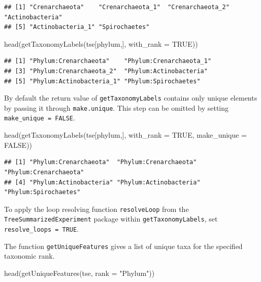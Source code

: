 \documentclass[
]{book}
\newenvironment{Shaded}{\begin{snugshade}}{\end{snugshade}}
\newcommand{\AttributeTok}[1]{\textcolor[rgb]{0.77,0.63,0.00}{#1}}
\newcommand{\ConstantTok}[1]{\textcolor[rgb]{0.00,0.00,0.00}{#1}}
\newcommand{\FunctionTok}[1]{\textcolor[rgb]{0.00,0.00,0.00}{#1}}
\newcommand{\NormalTok}[1]{#1}
\newcommand{\StringTok}[1]{\textcolor[rgb]{0.31,0.60,0.02}{#1}}
\begin{document}
\begin{verbatim}
## [1] "Crenarchaeota"    "Crenarchaeota_1"  "Crenarchaeota_2"  "Actinobacteria"  
## [5] "Actinobacteria_1" "Spirochaetes"
\end{verbatim}

\begin{Shaded}
\begin{Highlighting}[]
\FunctionTok{head}\NormalTok{(}\FunctionTok{getTaxonomyLabels}\NormalTok{(tse[phylum,], }\AttributeTok{with\_rank =} \ConstantTok{TRUE}\NormalTok{))}
\end{Highlighting}
\end{Shaded}

\begin{verbatim}
## [1] "Phylum:Crenarchaeota"    "Phylum:Crenarchaeota_1" 
## [3] "Phylum:Crenarchaeota_2"  "Phylum:Actinobacteria"  
## [5] "Phylum:Actinobacteria_1" "Phylum:Spirochaetes"
\end{verbatim}

By default the return value of \texttt{getTaxonomyLabels} contains only
unique elements by passing it through \texttt{make.unique}. This step can be
omitted by setting \texttt{make\_unique\ =\ FALSE}.

\begin{Shaded}
\begin{Highlighting}[]
\FunctionTok{head}\NormalTok{(}\FunctionTok{getTaxonomyLabels}\NormalTok{(tse[phylum,], }\AttributeTok{with\_rank =} \ConstantTok{TRUE}\NormalTok{, }\AttributeTok{make\_unique =} \ConstantTok{FALSE}\NormalTok{))}
\end{Highlighting}
\end{Shaded}

\begin{verbatim}
## [1] "Phylum:Crenarchaeota"  "Phylum:Crenarchaeota"  "Phylum:Crenarchaeota" 
## [4] "Phylum:Actinobacteria" "Phylum:Actinobacteria" "Phylum:Spirochaetes"
\end{verbatim}

To apply the loop resolving function \texttt{resolveLoop} from the
\texttt{TreeSummarizedExperiment} package \citep{R_TreeSummarizedExperiment} within
\texttt{getTaxonomyLabels}, set \texttt{resolve\_loops\ =\ TRUE}.

The function \texttt{getUniqueFeatures} gives a list of unique taxa for the
specified taxonomic rank.

\begin{Shaded}
\begin{Highlighting}[]
\FunctionTok{head}\NormalTok{(}\FunctionTok{getUniqueFeatures}\NormalTok{(tse, }\AttributeTok{rank =} \StringTok{"Phylum"}\NormalTok{))}
\end{Highlighting}
\end{Shaded}
\end{document}

